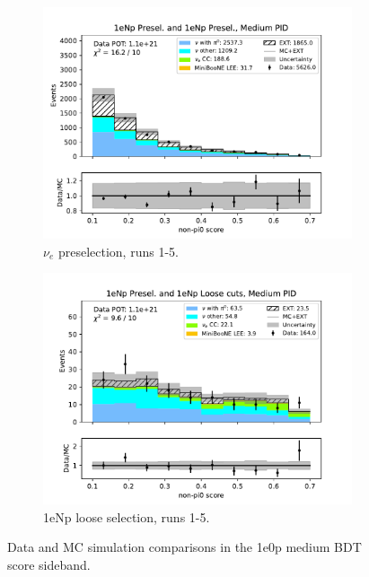 \begin{figure}[H]
\begin{subfigure}{0.5\linewidth}
        \includegraphics[width=\linewidth]{technote/Sidebands/Figures/NearSideband/near_sideband_nonpi0_score_run1234b4c4d5_NP_NP_MEDIUM_PID.pdf}
        \caption{$\nu_e$ preselection, runs 1-5.}
    \end{subfigure}%
    \begin{subfigure}{0.5\linewidth}
        \includegraphics[width=\linewidth]{technote/Sidebands/Figures/NearSideband/near_sideband_nonpi0_score_run1234b4c4d5_NP_NPL_MEDIUM_PID.pdf}
        \caption{1eNp loose selection, runs 1-5.}
    \end{subfigure}
    \caption{Data and MC simulation comparisons in the 1e0p medium BDT score sideband.}
\end{figure}


